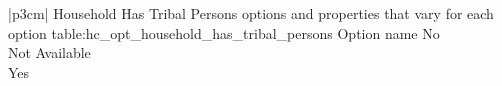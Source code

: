 \begin{customLongTable}{ |p{3cm}| }
{Household Has Tribal Persons options and properties that vary for each option} {table:hc_opt_household_has_tribal_persons}
{Option name}
No \\ \hline
Not Available \\ \hline
Yes \\
\end{customLongTable}
